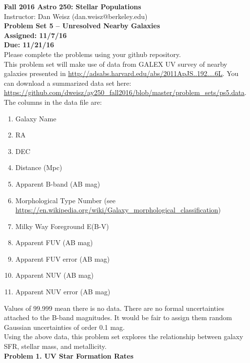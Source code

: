 \documentclass{article}
\begin{document}
\noindent \textbf{\large{Fall 2016 Astro 250: Stellar Populations}} \\
\noindent Instructor: Dan Weisz (dan.weisz@berkeley.edu) \\
\textbf{\large{Problem Set 5 -- Unresolved Nearby Galaxies}} \\
\textbf{{Assigned: 11/7/16}} \\
\textbf{{Due: 11/21/16}} \\

Please complete the problems using your github repository. \\

This problem set will make use of data from GALEX UV survey of nearby galaxies presented in \url{http://adsabs.harvard.edu/abs/2011ApJS..192....6L}.  You can download a summarized data set here: \url{https://github.com/dweisz/ay250_fall2016/blob/master/problem_sets/ps5.data}. \\

\noindent The columns in the data file are: 

\begin{enumerate}
\item Galaxy Name
\item RA
\item DEC
\item Distance (Mpc)
\item Apparent B-band (AB mag)
\item Morphological Type Number (see \url{https://en.wikipedia.org/wiki/Galaxy_morphological_classification})
\item Milky Way Foreground E(B-V)
\item Apparent FUV (AB mag)
\item Apparent FUV error (AB mag)
\item Apparent NUV (AB mag)
\item Apparent NUV error (AB mag)
\end{enumerate}

\noindent Values of 99.999 mean there is no data.  There are no formal uncertainties attached to the B-band magnitudes.  It would be fair to assign them random Gaussian uncertainties of order 0.1 mag.\\

\noindent Using the above data, this problem set explores the relationship between galaxy SFR, stellar mass, and metallicity. \\

\noindent \textbf{Problem 1. UV Star Formation Rates} \\
\end{document}
